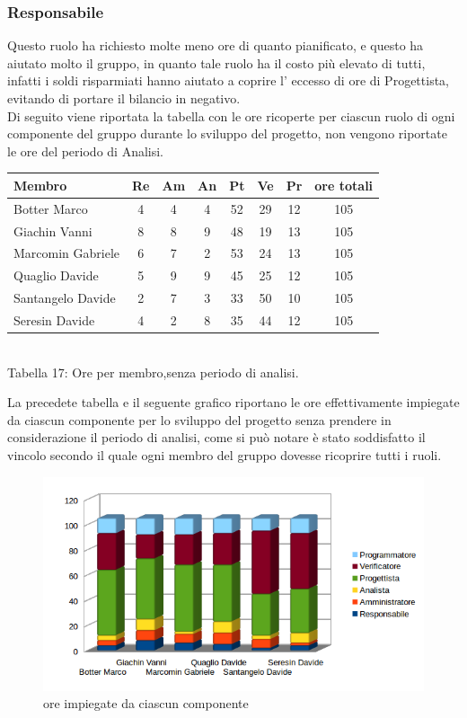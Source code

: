 \subsubsection{Responsabile}
Questo ruolo ha richiesto molte meno ore di quanto pianificato, e questo ha aiutato molto il gruppo, in quanto tale ruolo ha il costo più elevato di tutti, infatti i soldi risparmiati hanno aiutato a coprire l' eccesso di ore di Progettista, evitando di portare il bilancio in negativo.
\\
Di seguito viene riportata la tabella con le ore ricoperte per ciascun ruolo di ogni componente del gruppo durante lo sviluppo del progetto, non vengono riportate le ore del periodo di Analisi.
\begin{center}
\begin{tabular}{| l | c | c | c | c | c | c | c |}
\hline
Membro & Re & Am & An & Pt & Ve & Pr & ore totali \\
\hline
Botter Marco & 4 & 4 & 4 & 52 & 29 & 12 & 105 \\

Giachin Vanni & 8 & 8 & 9 & 48 & 19 & 13 & 105 \\

Marcomin Gabriele & 6 & 7 & 2 & 53 & 24 & 13 & 105 \\

Quaglio Davide & 5 & 9 & 9 & 45 & 25 & 12 & 105 \\

Santangelo Davide & 2 & 7 & 3 & 33 & 50 & 10 & 105 \\

Seresin Davide & 4 & 2 & 8 & 35 & 44 & 12 & 105 \\
\hline
\end{tabular}
\\
Tabella 17: Ore per membro,senza periodo di analisi.
\end{center}
La precedete tabella e il seguente grafico riportano le ore effettivamente impiegate da ciascun componente per lo sviluppo del progetto senza prendere in considerazione il periodo di analisi, come si può notare è stato soddisfatto il vincolo secondo il quale ogni membro del gruppo dovesse ricoprire tutti i ruoli.
\begin{figure}[H] \centering \includegraphics[width=%
\textwidth]
{../modello/img/totruoli.png} \caption{ore impiegate da ciascun componente}
\end{figure}
